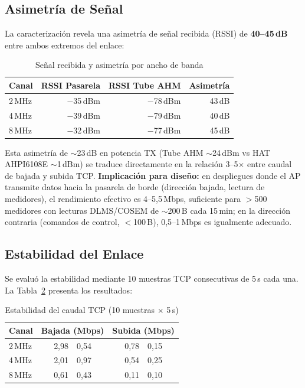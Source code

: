 \subsection{Asimetría de Señal}
\label{sec:resultados-halow-signal}



La caracterización revela una asimetría de señal recibida (RSSI) de \textbf{40--45\,dB} entre ambos extremos del enlace:

\begin{table}[H]
\centering
\caption{Señal recibida y asimetría por ancho de banda}
\label{tab:halow-signal-asymmetry}
\small
\begin{tabular}{l r r r}
\toprule
\textbf{Canal} & \textbf{RSSI Pasarela} & \textbf{RSSI Tube AHM} & \textbf{Asimetría} \\
\midrule
2\,MHz  & $-$35\,dBm & $-$78\,dBm & 43\,dB \\
4\,MHz  & $-$39\,dBm & $-$79\,dBm & 40\,dB \\
8\,MHz  & $-$32\,dBm & $-$77\,dBm & 45\,dB \\
\bottomrule
\end{tabular}
\end{table}

Esta asimetría de $\sim$23\,dB en potencia TX (Tube AHM $\sim$24\,dBm vs HAT AHPI6108E $\sim$1\,dBm) se traduce directamente en la relación 3--5$\times$ entre caudal de bajada y subida TCP. \textbf{Implicación para diseño:} en despliegues donde el AP transmite datos hacia la pasarela de borde (dirección bajada, lectura de medidores), el rendimiento efectivo es 4--5,5\,Mbps, suficiente para $>$500 medidores con lecturas DLMS/COSEM de $\sim$200\,B cada 15\,min; en la dirección contraria (comandos de control, $<$100\,B), 0,5--1\,Mbps es igualmente adecuado.


\subsection{Estabilidad del Enlace}
\label{sec:resultados-halow-estabilidad}

Se evaluó la estabilidad mediante 10 muestras TCP consecutivas de 5\,s cada una. La Tabla~\ref{tab:halow-stability} presenta los resultados:

\begin{table}[H]
\centering
\caption{Estabilidad del caudal TCP (10 muestras $\times$ 5\,s)}
\label{tab:halow-stability}
\small
\begin{tabular}{l r@{$\,\pm\,$}l r@{$\,\pm\,$}l}
\toprule
\textbf{Canal} & \multicolumn{2}{c}{\textbf{Bajada (Mbps)}} & \multicolumn{2}{c}{\textbf{Subida (Mbps)}} \\
\midrule
2\,MHz  & 2,98 & 0,54 & 0,78 & 0,15 \\
4\,MHz  & 2,01 & 0,97 & 0,54 & 0,25 \\
8\,MHz  & 0,61 & 0,43 & 0,11 & 0,10 \\
\bottomrule
\end{tabular}
\end{table}


